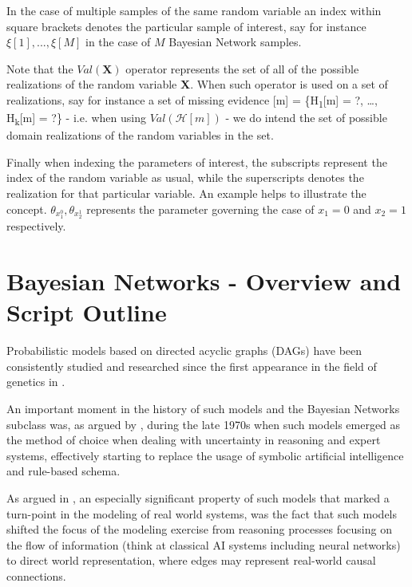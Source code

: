 \documentclass[11pt]{article}
\begin{document}
\begin{article}
In the case of multiple samples of the same random variable an index
within square brackets denotes the particular sample of interest, say
for instance \(\xi[1], ..., \xi[M]\) in the case of \(M\) Bayesian Network
samples.

Note that the \(Val(\textbf{X})\) operator represents the set of all of
the possible realizations of the random variable \textbf{X}. When such
operator is used on a set of realizations, say for instance a set of
missing evidence [m] = \{H\textsubscript{1}[m] = ?, \ldots{}, H\textsubscript{k}[m] = ?\} -
i.e. when using \(Val (\mathcal{H}[m])\) - we do intend the set of
possible domain realizations of the random variables in the set.

Finally when indexing the parameters of interest, the
subscripts represent the index of the random variable as usual, while
the superscripts denotes the realization for that particular
variable. An example helps to illustrate the concept. \(\theta_{x_1^0},
\theta_{x_2^1}\) represents the parameter governing the case of \(x_1 =
0\) and \(x_2 = 1\) respectively.

\newpage


\section{Bayesian Networks - Overview and Script Outline}
\label{sec:org2c6ab5e}

Probabilistic models based on directed acyclic graphs (DAGs) have
been consistently studied and researched since the first appearance
in the field of genetics in \cite{wright1921correlation}.

An important moment in the history of such models and the Bayesian
Networks subclass was, as argued by \cite{pearl2011bayesian}, during
the late 1970s when such models emerged as the method of choice when
dealing with uncertainty in reasoning and expert systems,
effectively starting to replace the usage of symbolic artificial
intelligence and rule-based schema.

As argued in \cite{pearl2011bayesian}, an especially significant
property of such models that marked a turn-point in the modeling of
real world systems, was the fact that such models shifted the focus
of the modeling exercise from reasoning processes focusing on the
flow of information (think at classical AI systems including neural
networks) to direct world representation, where edges may represent
real-world causal connections.


\end{article}
\end{document}

